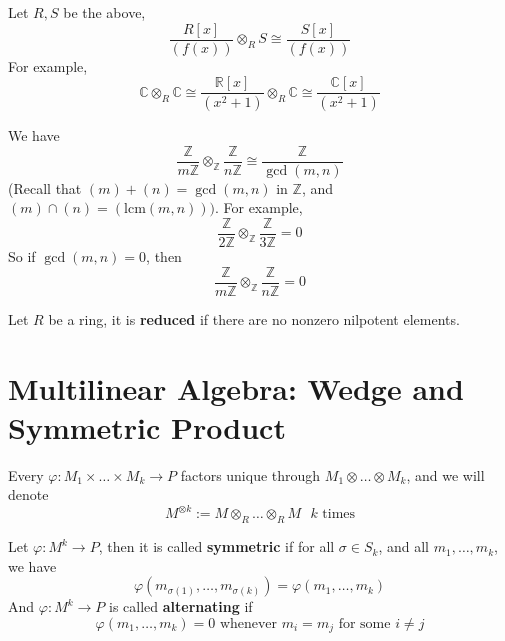 \documentclass[openany]{book}
\newcommand{\R}{\mathbb{R}}
\newcommand{\Z}{\mathbb{Z}}
\newcommand{\C}{\mathbb{C}}
\begin{document}
\begin{prop}
    Let $R, S$ be the above, 
    \begin{equation*}
        \frac{R[x]}{(f(x))}\otimes_RS\cong\frac{S[x]}{(f(x))}
    \end{equation*}
    For example, 
    \begin{equation*}
        \C\otimes_R\C\cong \frac{\R[x]}{(x^2+1)}\otimes_R\C\cong\frac{\C[x]}{(x^2+1)}
    \end{equation*}
\end{prop}



\begin{example}
    We have 
    \begin{equation*}
        \frac{\Z}{m\Z}\otimes_\Z\frac{\Z}{n\Z}\cong\frac{\Z}{\gcd(m,n)}
    \end{equation*}
    (Recall that $(m)+(n)=\gcd(m,n)$ in $\Z$, and $(m)\cap(n)=(\text{lcm}(m,n)))$. For example, 
    \begin{equation*}
        \frac{\Z}{2\Z}\otimes_\Z\frac{\Z}{3\Z}=0
    \end{equation*}
    So if $\gcd(m,n)=0$, then 
    \begin{equation*}
        \frac{\Z}{m\Z}\otimes_\Z\frac{\Z}{n\Z}=0
    \end{equation*}
\end{example}


\begin{defn}
    Let $R$ be a ring, it is \textbf{reduced} if there are no nonzero nilpotent elements.
\end{defn}


\section{Multilinear Algebra: Wedge and Symmetric Product}
Every $\varphi:M_1\times\dots\times M_k\to P$ factors unique through $M_1\otimes\dots\otimes M_k$, and we will denote 
\begin{equation*}
    M^{\otimes k}:=M\otimes_R\dots\otimes_R M \text{ $k$ times}
\end{equation*}


\begin{defn}
    Let $\varphi: M^k\to P$, then it is called \textbf{symmetric} if for all $\sigma\in S_k$, and all $m_1,\dots, m_k$, we have 
    \begin{equation*}
        \varphi(m_{\sigma(1)},\dots, m_{\sigma(k)})=\varphi(m_1,\dots, m_k)
    \end{equation*}
    And $\varphi: M^k\to P$ is called \textbf{alternating} if 
    \begin{equation*}
        \varphi(m_1,\dots, m_k)=0 \text{ whenever } m_i=m_j \text{ for some $i\neq j$}
    \end{equation*}
\end{defn}
\end{document}
